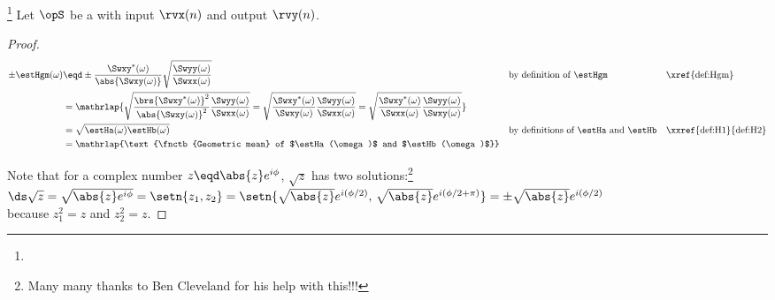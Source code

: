 \begin{proposition}
\footnote{
  }
\label{prop:Hgm}
Let $\opS$ be a  with input $\rvx(n)$ and output $\rvy(n)$.
\end{proposition}
\begin{proof}
\begin{align*}
  \pm\estHgm(\omega)
    &\eqd \pm\frac{\Swxy^\ast(\omega)}     %
                  {\abs{\Swxy(\omega)}}    %
             \sqrt{\frac{\Swyy(\omega)}    %
                        {\Swxx(\omega)}}   %
    && \text{by definition of $\estHgm$}   %
    && \text{\xref{def:Hgm}}               %
  \\&=\mathrlap{
       \sqrt{
         \frac{\brs{\Swxy^\ast(\omega)}^2}
              {\abs{\Swxy(\omega)}^2}
         \frac{\Swyy(\omega)}
              {\Swxx(\omega)}}
     = \sqrt{
         \frac{\Swxy^\ast(\omega)}
              {\Swxy(\omega)}
         \frac{\Swyy(\omega)}
              {\Swxx(\omega)}}
     = \sqrt{
         \frac{\Swxy^\ast(\omega)}
              {\Swxx(\omega)}
         \frac{\Swyy(\omega)}
              {\Swxy(\omega)}}
       }
  \\&= \sqrt{\estHa(\omega)\estHb(\omega)}
    && \text{by definitions of $\estHa$ and $\estHb$}
    && \text{\xxref{def:H1}{def:H2}}
  \\&= \mathrlap{\text{\fnctb{Geometric mean} of $\estHa(\omega)$ and $\estHb(\omega)$}}
\end{align*}

Note that for a complex number $z\eqd\abs{z}e^{i\phi}$, $\sqrt{z}$ has two solutions:\footnote{Many many thanks to Ben Cleveland for his help with this!!!}
\\\indentx$\ds\sqrt{z} = \sqrt{\abs{z}e^{i\phi}} = \setn{z_1,z_2}
   = \setn{\sqrt{\abs{z}}e^{i(\phi/2)},\,\sqrt{\abs{z}}e^{i(\phi/2+\pi)}}
   = \pm\sqrt{\abs{z}}e^{i(\phi/2)}$
\\
because $z_1^2=z$ and $z_2^2=z$.
\end{proof}


